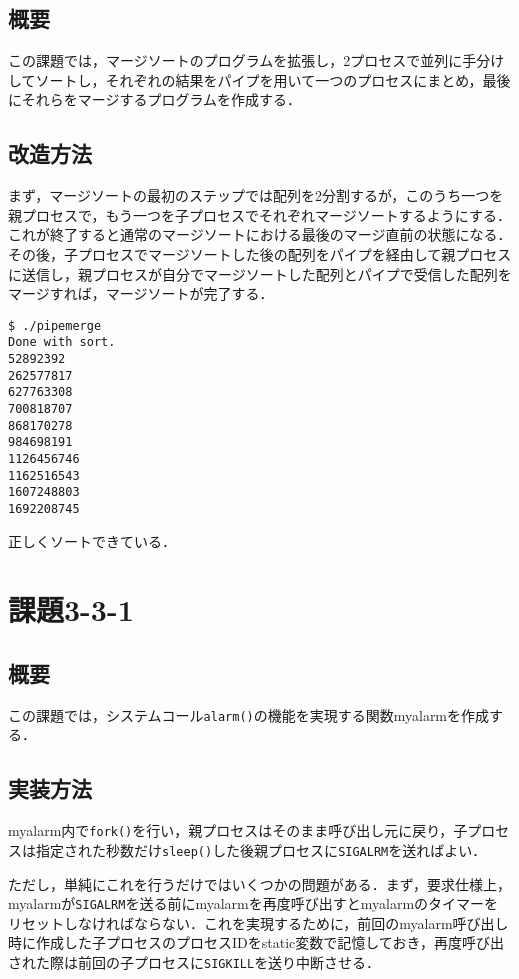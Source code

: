 \documentclass[a4j,10pt,titlepage]{jsarticle}
\begin{document}
\subsection{概要}
この課題では，マージソートのプログラムを拡張し，2プロセスで並列に手分けしてソートし，それぞれの結果をパイプを用いて一つのプロセスにまとめ，最後にそれらをマージするプログラムを作成する．

\subsection{改造方法}
まず，マージソートの最初のステップでは配列を2分割するが，このうち一つを親プロセスで，もう一つを子プロセスでそれぞれマージソートするようにする．これが終了すると通常のマージソートにおける最後のマージ直前の状態になる．その後，子プロセスでマージソートした後の配列をパイプを経由して親プロセスに送信し，親プロセスが自分でマージソートした配列とパイプで受信した配列をマージすれば，マージソートが完了する．

\begin{verbatim}
$ ./pipemerge 
Done with sort.
52892392
262577817
627763308
700818707
868170278
984698191
1126456746
1162516543
1607248803
1692208745
\end{verbatim}
正しくソートできている．

\section{課題3-3-1}
\subsection{概要}
この課題では，システムコール\verb|alarm()|の機能を実現する関数myalarmを作成する．

\subsection{実装方法}
myalarm内で\verb|fork()|を行い，親プロセスはそのまま呼び出し元に戻り，子プロセスは指定された秒数だけ\verb|sleep()|した後親プロセスに\verb|SIGALRM|を送ればよい．

ただし，単純にこれを行うだけではいくつかの問題がある．まず，要求仕様上，myalarmが\verb|SIGALRM|を送る前にmyalarmを再度呼び出すとmyalarmのタイマーをリセットしなければならない．これを実現するために，前回のmyalarm呼び出し時に作成した子プロセスのプロセスIDをstatic変数で記憶しておき，再度呼び出された際は前回の子プロセスに\verb|SIGKILL|を送り中断させる．
\end{document}
